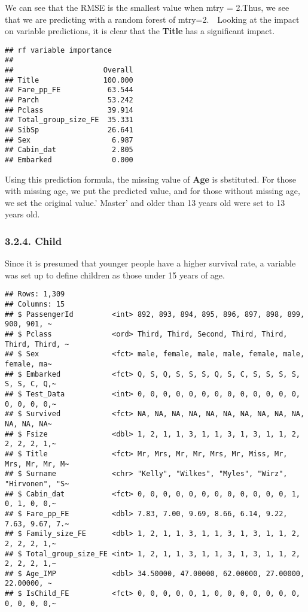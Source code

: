 \documentclass[
]{article}
\begin{document}
We can see that the RMSE is the smallest value when mtry = 2.Thus, we
see that we are predicting with a random forest of mtry=2.　Looking at
the impact on variable predictions, it is clear that the \textbf{Title}
has a significant impact.

\begin{verbatim}
## rf variable importance
## 
##                     Overall
## Title               100.000
## Fare_pp_FE           63.544
## Parch                53.242
## Pclass               39.914
## Total_group_size_FE  35.331
## SibSp                26.641
## Sex                   6.987
## Cabin_dat             2.805
## Embarked              0.000
\end{verbatim}

Using this prediction formula, the missing value of \textbf{Age} is
sbstituted. For those with missing age, we put the predicted value, and
for those without missing age, we set the original value.' Master' and
older than 13 years old were set to 13 years old.

\hypertarget{child}{%
\subsubsection{3.2.4. Child}\label{child}}

Since it is presumed that younger people have a higher survival rate, a
variable was set up to define children as those under 15 years of age.

\begin{verbatim}
## Rows: 1,309
## Columns: 15
## $ PassengerId         <int> 892, 893, 894, 895, 896, 897, 898, 899, 900, 901, ~
## $ Pclass              <ord> Third, Third, Second, Third, Third, Third, Third, ~
## $ Sex                 <fct> male, female, male, male, female, male, female, ma~
## $ Embarked            <fct> Q, S, Q, S, S, S, Q, S, C, S, S, S, S, S, S, C, Q,~
## $ Test_Data           <int> 0, 0, 0, 0, 0, 0, 0, 0, 0, 0, 0, 0, 0, 0, 0, 0, 0,~
## $ Survived            <fct> NA, NA, NA, NA, NA, NA, NA, NA, NA, NA, NA, NA, NA~
## $ Fsize               <dbl> 1, 2, 1, 1, 3, 1, 1, 3, 1, 3, 1, 1, 2, 2, 2, 2, 1,~
## $ Title               <fct> Mr, Mrs, Mr, Mr, Mrs, Mr, Miss, Mr, Mrs, Mr, Mr, M~
## $ Surname             <chr> "Kelly", "Wilkes", "Myles", "Wirz", "Hirvonen", "S~
## $ Cabin_dat           <fct> 0, 0, 0, 0, 0, 0, 0, 0, 0, 0, 0, 0, 1, 0, 1, 0, 0,~
## $ Fare_pp_FE          <dbl> 7.83, 7.00, 9.69, 8.66, 6.14, 9.22, 7.63, 9.67, 7.~
## $ Family_size_FE      <dbl> 1, 2, 1, 1, 3, 1, 1, 3, 1, 3, 1, 1, 2, 2, 2, 2, 1,~
## $ Total_group_size_FE <int> 1, 2, 1, 1, 3, 1, 1, 3, 1, 3, 1, 1, 2, 2, 2, 2, 1,~
## $ Age_IMP             <dbl> 34.50000, 47.00000, 62.00000, 27.00000, 22.00000, ~
## $ IsChild_FE          <fct> 0, 0, 0, 0, 0, 1, 0, 0, 0, 0, 0, 0, 0, 0, 0, 0, 0,~
\end{verbatim}
\end{document}

